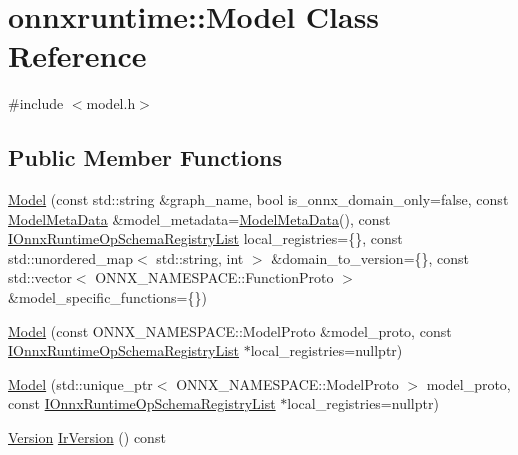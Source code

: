 \hypertarget{classonnxruntime_1_1Model}{}\section{onnxruntime\+:\+:Model Class Reference}
\label{classonnxruntime_1_1Model}


{\ttfamily \#include $<$model.\+h$>$}

\subsection*{Public Member Functions}
\begin{DoxyCompactItemize}
\item 
\mbox{\hyperlink{classonnxruntime_1_1Model_ae48985db0bd8ad5e58cc5a6693596a7e}{Model}} (const std\+::string \&graph\+\_\+name, bool is\+\_\+onnx\+\_\+domain\+\_\+only=false, const \mbox{\hyperlink{namespaceonnxruntime_a13519c21da77ccc594726b670276a266}{Model\+Meta\+Data}} \&model\+\_\+metadata=\mbox{\hyperlink{namespaceonnxruntime_a13519c21da77ccc594726b670276a266}{Model\+Meta\+Data}}(), const \mbox{\hyperlink{namespaceonnxruntime_a37a91305e7190e83fa9c66117a6a4746}{I\+Onnx\+Runtime\+Op\+Schema\+Registry\+List}} local\+\_\+registries=\{\}, const std\+::unordered\+\_\+map$<$ std\+::string, int $>$ \&domain\+\_\+to\+\_\+version=\{\}, const std\+::vector$<$ O\+N\+N\+X\+\_\+\+N\+A\+M\+E\+S\+P\+A\+C\+E\+::\+Function\+Proto $>$ \&model\+\_\+specific\+\_\+functions=\{\})
\item 
\mbox{\hyperlink{classonnxruntime_1_1Model_a9c173259b1fbf481bd9dfdecbd34f7f0}{Model}} (const O\+N\+N\+X\+\_\+\+N\+A\+M\+E\+S\+P\+A\+C\+E\+::\+Model\+Proto \&model\+\_\+proto, const \mbox{\hyperlink{namespaceonnxruntime_a37a91305e7190e83fa9c66117a6a4746}{I\+Onnx\+Runtime\+Op\+Schema\+Registry\+List}} $\ast$local\+\_\+registries=nullptr)
\item 
\mbox{\hyperlink{classonnxruntime_1_1Model_ae64329b4d073efb3122d23b362c5b5f5}{Model}} (std\+::unique\+\_\+ptr$<$ O\+N\+N\+X\+\_\+\+N\+A\+M\+E\+S\+P\+A\+C\+E\+::\+Model\+Proto $>$ model\+\_\+proto, const \mbox{\hyperlink{namespaceonnxruntime_a37a91305e7190e83fa9c66117a6a4746}{I\+Onnx\+Runtime\+Op\+Schema\+Registry\+List}} $\ast$local\+\_\+registries=nullptr)
\item 
\mbox{\hyperlink{namespaceonnxruntime_ab7fae8d5830807c074def3bb8ae23cf1}{Version}} \mbox{\hyperlink{classonnxruntime_1_1Model_a6a7bb4216f04ffd4fec8b43129d304d4}{Ir\+Version}} () const
\item 

\end{DoxyCompactItemize}
